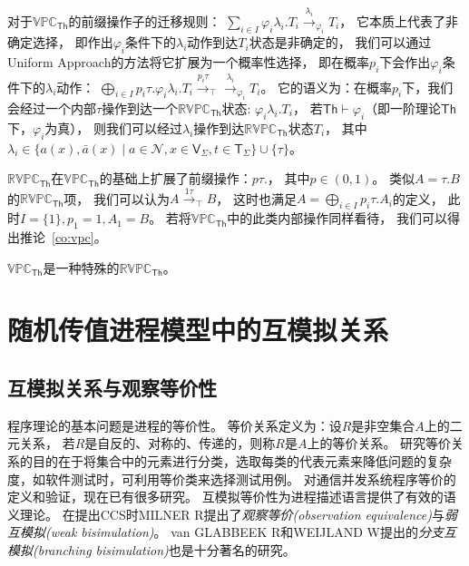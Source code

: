 对于$\mathbb{VPC}_{\mathsf{Th}}$的前缀操作子的迁移规则：
$\sum_{i\in I} \varphi_i \lambda_i. T_i\stackrel{\lambda_i}{\rightarrow}_{\varphi_i} T_i$，
它本质上代表了非确定选择，
即作出$\varphi_i$条件下的$\lambda_i$动作到达$T_i$状态是非确定的，
我们可以通过Uniform Approach的方法将它扩展为一个概率性选择，
即在概率$p_i$下会作出$\varphi_i$条件下的$\lambda_i$动作：
$\bigoplus_{i\in I} p_i\tau.\varphi_i \lambda_i. T_i\stackrel{p_i\tau}{\rightarrow}_{\top}\stackrel{\lambda_i}{\rightarrow}_{\varphi_i} T_i$。
它的语义为：在概率$p_i$下，我们会经过一个内部$\tau$操作到达一个$\mathbb{RVPC}_{\mathsf{Th}}$状态:
$\varphi_i\lambda_i.T_i$，
若$\mathsf{Th}\vdash \varphi_i$（即一阶理论$\mathsf{Th}$下，$\varphi_i$为真），
则我们可以经过$\lambda_i$操作到达$\mathbb{RVPC}_{\mathsf{Th}}$状态$T_i$， 
其中$\lambda_i \in \{a(x),\bar{a}(x)\mid a\in \mathcal{N}, x\in \mathsf{V}_\Sigma, t\in \mathsf{T}_\Sigma\}\cup \{\tau\}$。

$\mathbb{RVPC}_{\mathsf{Th}}$在$\mathbb{VPC}_{\mathsf{Th}}$的基础上扩展了前缀操作：$p\tau.$，
其中$p\in (0,1)$。
类似$A=\tau.B$的$\mathbb{RVPC}_{\mathsf{Th}}$项，
我们可以认为$A\stackrel{1\tau}{\rightarrow}_{\top} B$，
这时也满足$A=\bigoplus_{i\in I} p_i\tau.A_i$的定义，
此时$I=\{1\},p_1=1,A_1=B$。
若将$\mathbb{VPC}_{\mathsf{Th}}$中的此类内部操作同样看待，
我们可以得出推论~\ref{co:vpc}。
\begin{corollary}\label{co:vpc}
   $\mathbb{VPC}_{\mathsf{Th}}$是一种特殊的$\mathbb{RVPC}_{\mathsf{Th}}$。
\end{corollary}

\section{随机传值进程模型中的互模拟关系}

\subsection{互模拟关系与观察等价性}\label{ch:bisimulation}

   程序理论的基本问题是进程的等价性。
   等价关系定义为：设$R$是非空集合$A$上的二元关系，
   若$R$是自反的、对称的、传递的，则称$R$是$A$上的等价关系。
   研究等价关系的目的在于将集合中的元素进行分类，选取每类的代表元素来降低问题的复杂度，如软件测试时，可利用等价类来选择测试用例\cite{Equiv}。
   对通信并发系统程序等价的定义和验证，现在已有很多研究。
   互模拟等价性为进程描述语言提供了有效的语义理论。
   在提出CCS时MILNER R提出了\textit{观察等价(observation equivalence)}与\textit{弱互模拟(weak bisimulation)}\cite{Milner_CCS}。
   van GLABBEEK R和WEIJLAND W提出的\textit{分支互模拟(branching bisimulation)}\cite{Branching_1, Branching_2}也是十分著名的研究。

